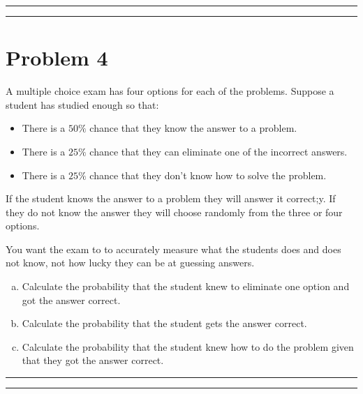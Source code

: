 \documentclass{article}
\theoremstyle{definition}
\newenvironment{solution}{\bigskip\hrule{\hfill}}{\bigskip\hrule{\hfill}} %
\begin{document}
\begin{solution}


\end{solution}


\newpage


\section*{Problem 4}

A multiple choice exam has four options for each of the problems. Suppose a student has studied enough so that:
\begin{itemize}
    \item There is a $50\%$ chance that they know the answer to a problem.
    \item There is a $25\%$ chance that they can eliminate one of the incorrect answers.
    \item There is a $25\%$ chance that they don't know how to solve the problem.
\end{itemize}
If the student knows the answer to a problem they will answer it correct;y. If they do not know the answer they will choose randomly from the three or four options. \medskip

You want the exam to to accurately measure what the students does and does not know, not how lucky they can be at guessing answers.

\begin{enumerate}[a)] %
    \item Calculate the probability that the student knew to eliminate one option and got the answer correct.
    \item Calculate the probability that the student gets the answer correct.
    \item Calculate the probability that the student knew how to do the problem given that they got the answer correct.
\end{enumerate}
\begin{solution}


\end{solution}
\end{document}
